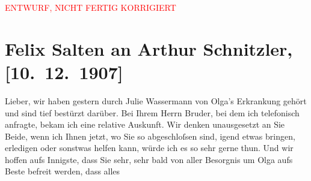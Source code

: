 
\begin{center}
            \textcolor{red}{ENTWURF, NICHT FERTIG KORRIGIERT}
                      \end{center}
            
         
         \renewcommand{\erwaehntePersonen}{Personen: Olga Schnitzler, Julius Schnitzler, Louise Schnitzler, Julie Wassermann}
         \renewcommand{\erwaehnteOrte}{Orte: Wien}
         \renewcommand{\erwaehnteWerke}{}
               \section[Felix Salten an Arthur Schnitzler, {[}10. 12. 1907{]}]{ Felix Salten an Arthur Schnitzler, {[}10. 12. 1907{]}}\nopagebreak{}\rehead{ }\begin{ledgroupsized}[t]{13cm}\normalsize\beginnumbering \toendnotes[C]{\smallbreak\pagebreak[2]} 
\toendnotes[C]{\smallbreak}\pstart
           \noindent{}{\pb}Lieber, wir haben gestern durch Julie
                  Wassermann von Olga’s Erkrankung gehört
               und sind tief bestürzt darüber. Bei Ihrem Herrn Bruder, bei dem ich telefonisch anfragte, bekam ich eine
               relative Auskunft. Wir denken unausgesetzt an Sie Beide, wenn ich Ihnen jetzt, wo Sie so abgeschloſsen sind,
               igend etwas bringen, erledigen oder sonstwas helfen kann, würde ich es so sehr gerne
               thun. Und wir hoffen aufs Innigste, dass Sie sehr, sehr bald von aller Besorgnis um
                  Olga aufs Beste befreit werden, dass alles

\end{ledgroupsized}

